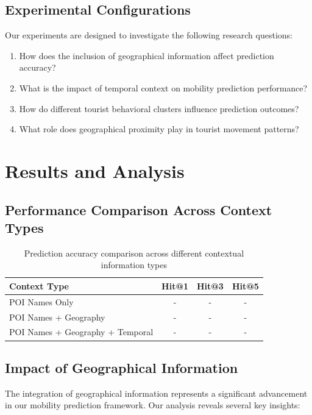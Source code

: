 \documentclass[12pt,a4paper]{article}
\begin{document}
\subsection{Experimental Configurations}

Our experiments are designed to investigate the following research questions:

\begin{enumerate}
\item How does the inclusion of geographical information affect prediction accuracy?
\item What is the impact of temporal context on mobility prediction performance?
\item How do different tourist behavioral clusters influence prediction outcomes?
\item What role does geographical proximity play in tourist movement patterns?
\end{enumerate}

\section{Results and Analysis}

\subsection{Performance Comparison Across Context Types}

\begin{table}[H]
\centering
\caption{Prediction accuracy comparison across different contextual information types}
\label{tab:context_comparison}
\begin{tabular}{@{}lccc@{}}
\toprule
Context Type & Hit@1 & Hit@3 & Hit@5 \\
\midrule
POI Names Only & - & - & - \\
POI Names + Geography & - & - & - \\
POI Names + Geography + Temporal & - & - & - \\
\bottomrule
\end{tabular}
\end{table}

\subsection{Impact of Geographical Information}

The integration of geographical information represents a significant advancement in our mobility prediction framework. Our analysis reveals several key insights:
\end{document}
